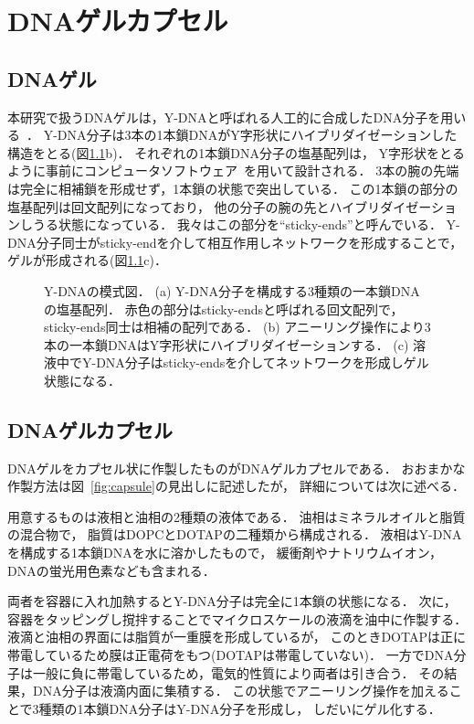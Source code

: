 \chapter{DNAゲルカプセル}
\label{sec:dnagel}

\section{DNAゲル}

本研究で扱うDNAゲルは，Y-DNAと呼ばれる人工的に合成したDNA分子を用いる~\cite{sato2019sequence}．
Y-DNA分子は3本の1本鎖DNAがY字形状にハイブリダイゼーションした構造をとる(図\ref{fig:ydna}b)．
それぞれの1本鎖DNA分子の塩基配列は，
Y字形状をとるように事前にコンピュータソフトウェア~\cite{zadeh2011nupack}を用いて設計される．
3本の腕の先端は完全に相補鎖を形成せず，1本鎖の状態で突出している．
この1本鎖の部分の塩基配列は回文配列になっており，
他の分子の腕の先とハイブリダイゼーションしうる状態になっている．
我々はこの部分を``sticky-ends''と呼んでいる．
Y-DNA分子同士がsticky-endを介して相互作用しネットワークを形成することで，ゲルが形成される(図\ref{fig:ydna}c)．

\begin{figure}
\centering

\caption{Y-DNAの模式図．
    (a) Y-DNA分子を構成する3種類の一本鎖DNAの塩基配列．
        赤色の部分はsticky-endsと呼ばれる回文配列で，sticky-ends同士は相補の配列である．
    (b) アニーリング操作により3本の一本鎖DNAはY字形状にハイブリダイゼーションする．
    (c) 溶液中でY-DNA分子はsticky-endsを介してネットワークを形成しゲル状態になる．
}

\label{fig:ydna}
\end{figure}

\section{DNAゲルカプセル}

DNAゲルをカプセル状に作製したものがDNAゲルカプセルである．
おおまかな作製方法は図~\ref{fig:capsule}の見出しに記述したが，
詳細については次に述べる．

用意するものは液相と油相の2種類の液体である．
油相はミネラルオイルと脂質の混合物で，
脂質はDOPCとDOTAPの二種類から構成される．
液相はY-DNAを構成する1本鎖DNAを水に溶かしたもので，
緩衝剤やナトリウムイオン，DNAの蛍光用色素なども含まれる．

両者を容器に入れ加熱するとY-DNA分子は完全に1本鎖の状態になる．
次に，容器をタッピングし撹拌することでマイクロスケールの液滴を油中に作製する．
液滴と油相の界面には脂質が一重膜を形成しているが，
このときDOTAPは正に帯電しているため膜は正電荷をもつ(DOTAPは帯電していない)．
一方でDNA分子は一般に負に帯電しているため，電気的性質により両者は引き合う．
その結果，DNA分子は液滴内面に集積する．
この状態でアニーリング操作を加えることで3種類の1本鎖DNA分子はY-DNA分子を形成し，
しだいにゲル化する．

